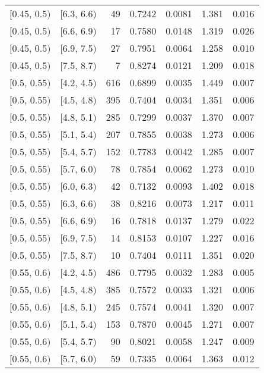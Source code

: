 \begin{longtable}{| l | l | r | r | r | r | r |}
        $[$0.45, 0.5$)$ & $[$6.3, 6.6$)$ & 49  & 0.7242 & 0.0081 & 1.381 & 0.016 \\
        $[$0.45, 0.5$)$ & $[$6.6, 6.9$)$ & 17  & 0.7580 & 0.0148 & 1.319 & 0.026 \\
        $[$0.45, 0.5$)$ & $[$6.9, 7.5$)$ & 27  & 0.7951 & 0.0064 & 1.258 & 0.010 \\
        $[$0.45, 0.5$)$ & $[$7.5, 8.7$)$ & 7   & 0.8274 & 0.0121 & 1.209 & 0.018 \\
        $[$0.5, 0.55$)$ & $[$4.2, 4.5$)$ & 616 & 0.6899 & 0.0035 & 1.449 & 0.007 \\
        $[$0.5, 0.55$)$ & $[$4.5, 4.8$)$ & 395 & 0.7404 & 0.0034 & 1.351 & 0.006 \\
        $[$0.5, 0.55$)$ & $[$4.8, 5.1$)$ & 285 & 0.7299 & 0.0037 & 1.370 & 0.007 \\
        $[$0.5, 0.55$)$ & $[$5.1, 5.4$)$ & 207 & 0.7855 & 0.0038 & 1.273 & 0.006 \\
        $[$0.5, 0.55$)$ & $[$5.4, 5.7$)$ & 152 & 0.7783 & 0.0042 & 1.285 & 0.007 \\
        $[$0.5, 0.55$)$ & $[$5.7, 6.0$)$ & 78  & 0.7854 & 0.0062 & 1.273 & 0.010 \\
        $[$0.5, 0.55$)$ & $[$6.0, 6.3$)$ & 42  & 0.7132 & 0.0093 & 1.402 & 0.018 \\
        $[$0.5, 0.55$)$ & $[$6.3, 6.6$)$ & 38  & 0.8216 & 0.0073 & 1.217 & 0.011 \\
        $[$0.5, 0.55$)$ & $[$6.6, 6.9$)$ & 16  & 0.7818 & 0.0137 & 1.279 & 0.022 \\
        $[$0.5, 0.55$)$ & $[$6.9, 7.5$)$ & 14  & 0.8153 & 0.0107 & 1.227 & 0.016 \\
        $[$0.5, 0.55$)$ & $[$7.5, 8.7$)$ & 10  & 0.7404 & 0.0111 & 1.351 & 0.020 \\
        $[$0.55, 0.6$)$ & $[$4.2, 4.5$)$ & 486 & 0.7795 & 0.0032 & 1.283 & 0.005 \\
        $[$0.55, 0.6$)$ & $[$4.5, 4.8$)$ & 385 & 0.7572 & 0.0033 & 1.321 & 0.006 \\
        $[$0.55, 0.6$)$ & $[$4.8, 5.1$)$ & 245 & 0.7574 & 0.0041 & 1.320 & 0.007 \\
        $[$0.55, 0.6$)$ & $[$5.1, 5.4$)$ & 153 & 0.7870 & 0.0045 & 1.271 & 0.007 \\
        $[$0.55, 0.6$)$ & $[$5.4, 5.7$)$ & 90  & 0.8021 & 0.0058 & 1.247 & 0.009 \\
        $[$0.55, 0.6$)$ & $[$5.7, 6.0$)$ & 59  & 0.7335 & 0.0064 & 1.363 & 0.012 \\

\end{longtable}
